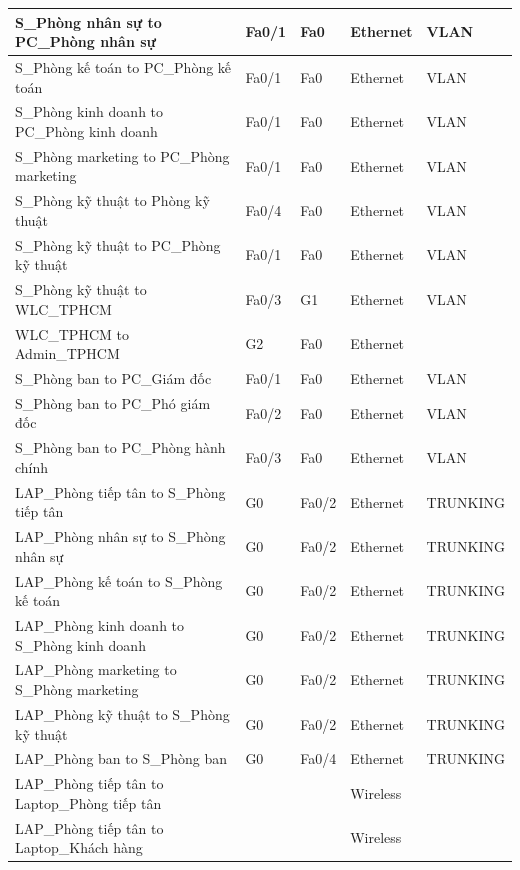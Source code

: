 \documentclass[12pt,a4paper]{report}
\begin{document}
\begin{center}
\begin{longtable}{|p{}|p{}|p{}|p{}|p{}|}
\hline  S\_Phòng nhân sự  to  PC\_Phòng nhân sự  &  Fa0/1  &  Fa0  &  Ethernet  &  VLAN \\
\hline  S\_Phòng kế toán  to  PC\_Phòng kế toán  &  Fa0/1  &  Fa0  &  Ethernet  &  VLAN \\
\hline  S\_Phòng kinh doanh  to  PC\_Phòng kinh doanh  &  Fa0/1  &  Fa0  &  Ethernet  &  VLAN \\
\hline  S\_Phòng marketing  to  PC\_Phòng marketing  &  Fa0/1  &  Fa0  &  Ethernet  &  VLAN \\
\hline  S\_Phòng kỹ thuật  to  Phòng kỹ thuật  &  Fa0/4  &  Fa0  &  Ethernet  &  VLAN \\
\hline  S\_Phòng kỹ thuật  to  PC\_Phòng kỹ thuật  &  Fa0/1  &  Fa0  &  Ethernet  &  VLAN \\
\hline  S\_Phòng kỹ thuật  to  WLC\_TPHCM  &  Fa0/3  &  G1  &  Ethernet  &  VLAN \\
\hline  WLC\_TPHCM  to  Admin\_TPHCM  &  G2  &  Fa0  &  Ethernet  &   \\
\hline  S\_Phòng ban  to  PC\_Giám đốc  &  Fa0/1  &  Fa0  &  Ethernet  &  VLAN \\
\hline  S\_Phòng ban  to  PC\_Phó giám đốc  &  Fa0/2  &  Fa0  &  Ethernet  &  VLAN \\
\hline  S\_Phòng ban  to  PC\_Phòng hành chính  &  Fa0/3  &  Fa0  &  Ethernet  &  VLAN \\
\hline  LAP\_Phòng tiếp tân  to  S\_Phòng tiếp tân  &  G0  &  Fa0/2  &  Ethernet  &  TRUNKING \\
\hline  LAP\_Phòng nhân sự  to  S\_Phòng nhân sự  &  G0  &  Fa0/2  &  Ethernet  &  TRUNKING \\
\hline  LAP\_Phòng kế toán  to  S\_Phòng kế toán  &  G0  &  Fa0/2  &  Ethernet  &  TRUNKING \\
\hline  LAP\_Phòng kinh doanh  to  S\_Phòng kinh doanh  &  G0  &  Fa0/2  &  Ethernet  &  TRUNKING \\
\hline  LAP\_Phòng marketing  to  S\_Phòng marketing  &  G0  &  Fa0/2  &  Ethernet  &  TRUNKING \\
\hline  LAP\_Phòng kỹ thuật  to  S\_Phòng kỹ thuật  &  G0  &  Fa0/2  &  Ethernet  &  TRUNKING \\
\hline  LAP\_Phòng ban  to  S\_Phòng ban  &  G0  &  Fa0/4  &  Ethernet  &  TRUNKING \\
\hline  LAP\_Phòng tiếp tân  to  Laptop\_Phòng tiếp tân  &    &    &  Wireless  &   \\
\hline  LAP\_Phòng tiếp tân  to  Laptop\_Khách hàng  &    &    &  Wireless  &   \\

\end{longtable}
\end{center}
\end{document}
